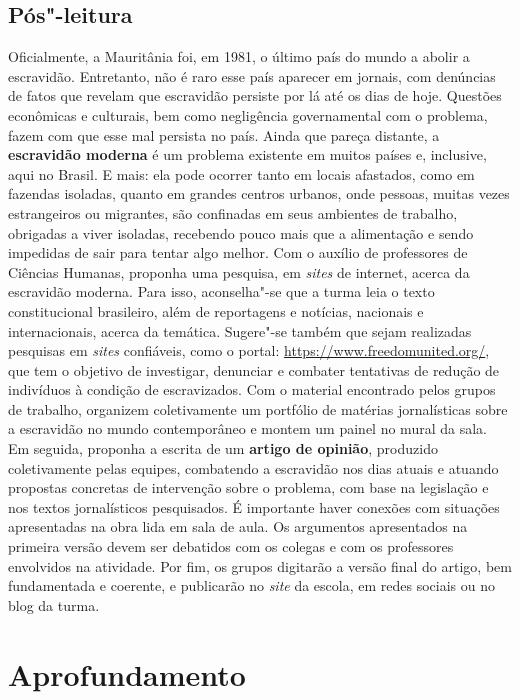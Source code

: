 \documentclass[12pt]{extarticle}
\begin{document}
\subsection{Pós"-leitura}

Oficialmente, a Mauritânia foi, em 1981, o último país do
mundo a abolir a escravidão. Entretanto, não é raro esse país aparecer
em jornais, com denúncias de fatos que revelam que escravidão persiste
por lá até os dias de hoje. Questões econômicas e culturais, bem como
negligência governamental com o problema, fazem com que esse mal
persista no país. Ainda que pareça distante, a \textbf{escravidão
moderna} é um problema existente em muitos países e, inclusive, aqui no
Brasil. E mais: ela pode ocorrer tanto em locais afastados, como em
fazendas isoladas, quanto em grandes centros urbanos, onde pessoas,
muitas vezes estrangeiros ou migrantes, são confinadas em seus ambientes
de trabalho, obrigadas a viver isoladas, recebendo pouco mais que a
alimentação e sendo impedidas de sair para tentar algo melhor. Com o
auxílio de professores de Ciências Humanas, proponha uma pesquisa, em
\emph{sites} de internet, acerca da escravidão moderna. Para isso,
aconselha"-se que a turma leia o texto constitucional brasileiro, além de
reportagens e notícias, nacionais e internacionais, acerca da temática.
Sugere"-se também que sejam realizadas pesquisas em \emph{sites}
confiáveis, como o portal: \url{https://www.freedomunited.org/}, que tem
o objetivo de investigar, denunciar e combater tentativas de redução de
indivíduos à condição de escravizados. Com o material encontrado pelos
grupos de trabalho, organizem coletivamente um portfólio de matérias
jornalísticas sobre a escravidão no mundo contemporâneo e montem um
painel no mural da sala. Em seguida, proponha a escrita de um
\textbf{artigo de opinião}, produzido coletivamente pelas equipes,
combatendo a escravidão nos dias atuais e atuando propostas concretas de
intervenção sobre o problema, com base na legislação e nos textos
jornalísticos pesquisados. É importante haver conexões com situações
apresentadas na obra lida em sala de aula. Os argumentos apresentados na
primeira versão devem ser debatidos com os colegas e com os professores
envolvidos na atividade. Por fim, os grupos digitarão a versão final do
artigo, bem fundamentada e coerente, e publicarão no \emph{site} da
escola, em redes sociais ou no blog da turma.

\section{Aprofundamento}
\end{document}

